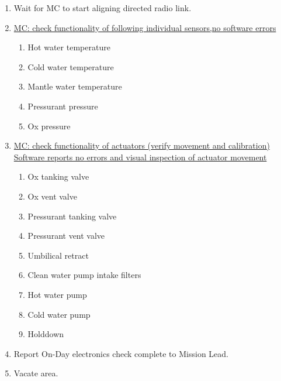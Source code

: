 \begin{enumerate}[label=P\arabic*.]
    \item \label{pad_on_day_elec_start} Wait for MC to start aligning directed radio link.\checkbox
    \item \underline{MC: check functionality of following individual sensors,}\newline\underline{no software errors}
      \begin{enumerate}[label*=\arabic*.]
            \item Hot water temperature \leftcheckbox
            \item Cold water temperature \leftcheckbox
            \item Mantle water temperature \leftcheckbox
            \item Pressurant pressure \leftcheckbox
            \item Ox pressure \leftcheckbox
      \end{enumerate}
  \item \underline{MC:
    check functionality of actuators (verify movement and calibration)}
    \newline\underline{Software reports no errors and visual inspection of actuator movement}
      \begin{enumerate}[label*=\arabic*.]
            \item Ox tanking valve \leftcheckbox
            \item Ox vent valve \leftcheckbox
            \item Pressurant tanking valve \leftcheckbox
            \item Pressurant vent valve \leftcheckbox
            \item Umbilical retract \leftcheckbox
            \item Clean water pump intake filters \leftcheckbox
            \item Hot water pump \leftcheckbox
            \item Cold water pump \leftcheckbox
            \item Holddown \leftcheckbox
      \end{enumerate}
    
    \item Report On-Day electronics check complete to Mission Lead.\checkbox
    \item \label{pad_on_day_elec_end} Vacate area.\checkbox
    

\end{enumerate}
